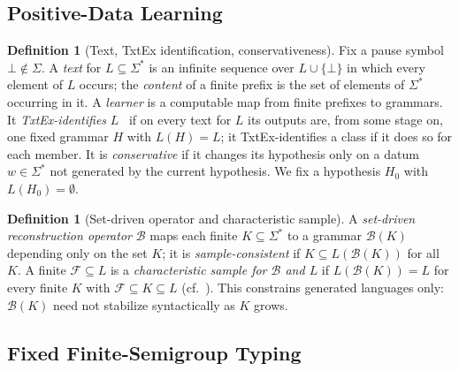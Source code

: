 \documentclass[11pt]{article}
\numberwithin{equation}{section}
\theoremstyle{plain}
\theoremstyle{definition}
\newtheorem{definition}[theorem]{Definition}
\theoremstyle{remark}
\newcommand{\pausesym}{\bot}
\begin{document}
\subsection{Positive-Data Learning}

\begin{definition}[Text, TxtEx identification, conservativeness]
Fix a pause symbol $\pausesym\notin\Sigma$.  A \emph{text} for
$L\subseteq\Sigma^*$ is an infinite sequence over $L\cup\{\pausesym\}$ in which
every element of $L$ occurs; the \emph{content} of a finite prefix is the set
of elements of $\Sigma^*$ occurring in it.  A \emph{learner} is a computable map
from finite prefixes to grammars.  It \emph{TxtEx-identifies} $L$~\cite{Gold1967}
if on every text for $L$ its outputs are, from some stage on, one fixed grammar
$H$ with $L(H)=L$; it TxtEx-identifies a class if it does so for each member.
It is \emph{conservative} if it changes its hypothesis only on a datum
$w\in\Sigma^*$ not generated by the current hypothesis.  We fix a hypothesis
$H_0$ with $L(H_0)=\emptyset$.
\end{definition}

\begin{definition}[Set-driven operator and characteristic sample]
\label{def:characteristic-sample}
A \emph{set-driven reconstruction operator} $\mathcal B$ maps each finite
$K\subseteq\Sigma^*$ to a grammar $\mathcal B(K)$ depending only on the set
$K$; it is \emph{sample-consistent} if $K\subseteq L(\mathcal B(K))$ for all
$K$.  A finite $\mathcal F\subseteq L$ is a \emph{characteristic sample for
$\mathcal B$ and $L$} if $L(\mathcal B(K))=L$ for every finite $K$ with
$\mathcal F\subseteq K\subseteq L$ (cf.~\cite{deLaHiguera1997}).  This
constrains generated languages only: $\mathcal B(K)$ need not stabilize
syntactically as $K$ grows.
\end{definition}

\subsection{Fixed Finite-Semigroup Typing}
\label{subsec:semigroup-typing}
\end{document}
